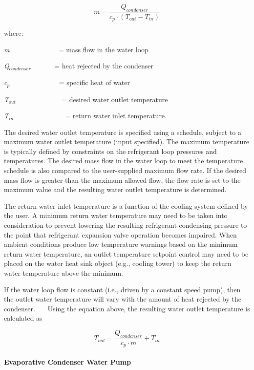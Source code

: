 \begin{equation}
m = \frac{{{Q_{condenser}}}}{{{c_p} \cdot ({T_{out}} - {T_{in}})}}
\end{equation}

where:

\emph{m} ~~~~~~~~~~~~~ = mass flow in the water loop

\emph{Q\(_{condenser}\)~~~~~~} = heat rejected by the condenser

\emph{c\(_{p}\)~~} ~~~~~~~~~~~ = specific heat of water

\emph{T\(_{out}\)~} ~~~~~~~~~~~ = desired water outlet temperature

\emph{T\(_{in}\)~~~~~~~~~~~~~~ =} return water inlet temperature.

The desired water outlet temperature is specified using a schedule, subject to a maximum water outlet temperature (input specified). The maximum temperature is typically defined by constraints on the refrigerant loop pressures and temperatures. The desired mass flow in the water loop to meet the temperature schedule is also compared to the user-supplied maximum flow rate. If the desired mass flow is greater than the maximum allowed flow, the flow rate is set to the maximum value and the resulting water outlet temperature is determined.

The return water inlet temperature is a function of the cooling system defined by the user. A minimum return water temperature may need to be taken into consideration to prevent lowering the resulting refrigerant condensing pressure to the point that refrigerant expansion valve operation becomes impaired. When ambient conditions produce low temperature warnings based on the minimum return water temperature, an outlet temperature setpoint control may need to be placed on the water heat sink object (e.g., cooling tower) to keep the return water temperature above the minimum.

If the water loop flow is constant (i.e., driven by a constant speed pump), then the outlet water temperature will vary with the amount of heat rejected by the condenser.~~~ Using the equation above, the resulting water outlet temperature is calculated as

\begin{equation}
{T_{out}} = \frac{{{Q_{condenser}}}}{{{c_p} \cdot m}} + {T_{in}}
\end{equation}

\paragraph{Evaporative Condenser Water Pump}\label{evaporative-condenser-water-pump}

